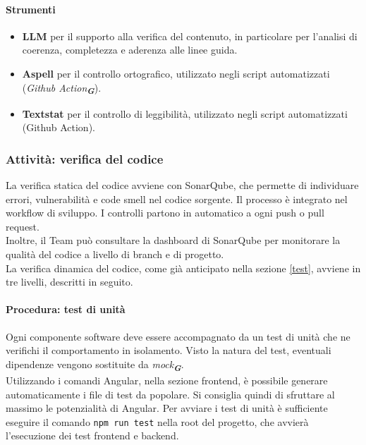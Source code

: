\documentclass[a4paper,12pt]{article}
\newcommand{\glossario}[1]{\textit{#1}\textsubscript{\textbf{\textit{\textcolor{lightblack}{G}}}}}
\begin{document}
\paragraph{Strumenti}
\begin{itemize}
    \item \textbf{LLM} per il supporto alla verifica del contenuto, in particolare per l'analisi di coerenza, completezza e aderenza alle linee guida.
    \item \textbf{Aspell} per il controllo ortografico, utilizzato negli script automatizzati (\glossario{Github Action}).
    \item \textbf{Textstat} per il controllo di leggibilità, utilizzato negli script automatizzati (Github Action).
\end{itemize}

\subsubsection{Attività: verifica del codice}\label{verifica}
La verifica statica del codice avviene con SonarQube, che permette di individuare errori, vulnerabilità e code smell nel codice sorgente.
Il processo è integrato nel workflow di sviluppo. I controlli partono in automatico a ogni push o pull request.\\
Inoltre, il Team può consultare la dashboard di SonarQube per monitorare la qualità del codice a livello di branch e di progetto.\\
La verifica dinamica del codice, come già anticipato nella sezione \ref{test}, avviene in tre livelli, descritti in seguito.

\paragraph{Procedura: test di unità}
Ogni componente software deve essere accompagnato da un test di unità che ne verifichi il comportamento in isolamento. Visto la natura del test, eventuali dipendenze vengono sostituite da \glossario{mock}.\\
Utilizzando i comandi Angular, nella sezione frontend, è possibile generare automaticamente i file di test da popolare. Si consiglia quindi di sfruttare al massimo le potenzialità di Angular.
Per avviare i test di unità è sufficiente eseguire il comando \texttt{npm run test} nella root del progetto, che avvierà l'esecuzione dei test frontend e backend. 
\end{document}
